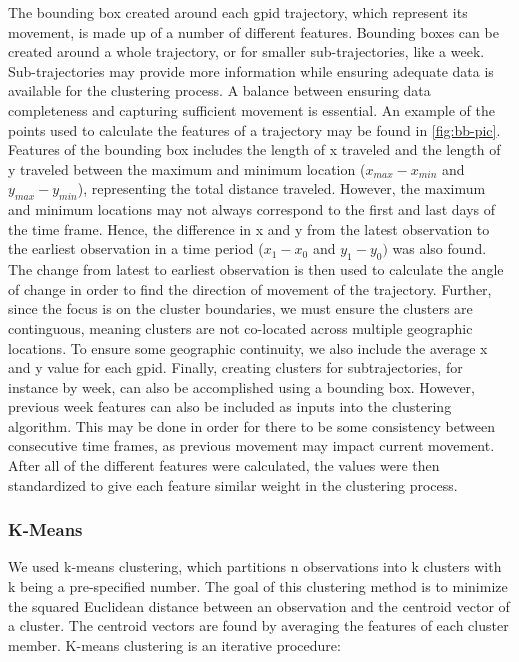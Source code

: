 \documentclass[12pt]{article}
\begin{document}
The bounding box created around each gpid trajectory, which represent
its movement, is made up of a number of different features. Bounding
boxes can be created around a whole trajectory, or for smaller
sub-trajectories, like a week. Sub-trajectories may provide more
information while ensuring adequate data is available for the clustering
process. A balance between ensuring data completeness and capturing
sufficient movement is essential. An example of the points used to
calculate the features of a trajectory may be found in
\cref{fig:bb-pic}. Features of the bounding box includes the length of x
traveled and the length of y traveled between the maximum and minimum
location (\(x_{max} - x_{min}\) and \(y_{max} - y_{min}\)), representing
the total distance traveled. However, the maximum and minimum locations
may not always correspond to the first and last days of the time frame.
Hence, the difference in x and y from the latest observation to the
earliest observation in a time period (\(x_{1} - x_{0}\) and
\(y_{1} - y_{0})\) was also found. The change from latest to earliest
observation is then used to calculate the angle of change in order to
find the direction of movement of the trajectory. Further, since the
focus is on the cluster boundaries, we must ensure the clusters are
continguous, meaning clusters are not co-located across multiple
geographic locations. To ensure some geographic continuity, we also
include the average x and y value for each gpid. Finally, creating
clusters for subtrajectories, for instance by week, can also be
accomplished using a bounding box. However, previous week features can
also be included as inputs into the clustering algorithm. This may be
done in order for there to be some consistency between consecutive time
frames, as previous movement may impact current movement. After all of
the different features were calculated, the values were then
standardized to give each feature similar weight in the clustering
process.

\hypertarget{k-means}{%
\subsubsection{K-Means}\label{k-means}}

We used k-means clustering, which partitions n observations into k
clusters with k being a pre-specified number. The goal of this
clustering method is to minimize the squared Euclidean distance between
an observation and the centroid vector of a cluster. The centroid
vectors are found by averaging the features of each cluster member.
K-means clustering is an iterative procedure:
\end{document}
